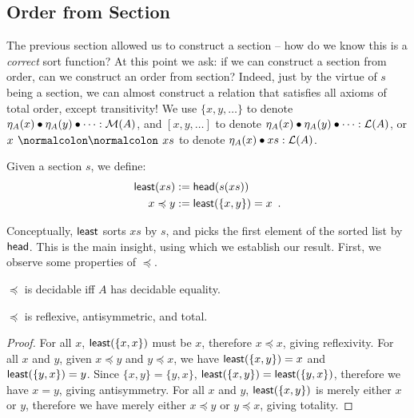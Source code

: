 \subsection{Order from Section}

The previous section allowed us to construct a section -- how do we know this is a \emph{correct} sort function?
%
At this point we ask: if we can construct a section from order, can we construct an order from section?
%
Indeed, just by the virtue of $s$ being a section, we can almost construct a relation that satisfies
all axioms of total order, except transitivity!
We use $\{x,y,\dots\}$ to denote $\eta_A(x) \mathbin{\bullet} \eta_A(y) \mathbin{\bullet} \dots : \mathcal{M}(A)$,
and $[x, y, \dots]$ to denote $\eta_A(x) \mathbin{\bullet} \eta_A(y) \mathbin{\bullet} \dots : \mathcal{L}(A)$,
or $x \cons xs$ to denote $\eta_A(x) \mathbin{\bullet} xs : \mathcal{L}(A)$.

\begin{definition}
    \label{def:least}
    Given a section $s$, we define:
    \[
        \begin{aligned}
            \operatorname{\mathsf{least}}(xs) & := \operatorname{\mathsf{head}}(s(xs))                    \\
            x \preccurlyeq y & := \operatorname{\mathsf{least}}(\{x, y\}) = x \enspace .
        \end{aligned}
    \]
\end{definition}

Conceptually, $\operatorname{\mathsf{least}}$ sorts $xs$ by $s$, and picks the first element of the sorted list by~$\operatorname{\mathsf{head}}$.
This is the main insight, using which we establish our result.
First, we observe some properties of $\preccurlyeq$.

\begin{proposition}
    $\preccurlyeq$ is decidable iff $A$ has decidable equality.
\end{proposition}

\begin{proposition}\label{sort:almost-total}
    $\preccurlyeq$ is reflexive, antisymmetric, and total.
\end{proposition}
\begin{proof}
    For all $x$, $\operatorname{\mathsf{least}}(\{x, x\})$ must be $x$, therefore $x \preccurlyeq x$, giving reflexivity.
    For all $x$ and $y$, given $x \preccurlyeq y$ and $y \preccurlyeq x$,
    we have $\operatorname{\mathsf{least}}(\{x, y\}) = x$ and $\operatorname{\mathsf{least}}(\{y, x\}) = y$.
    Since $\{x, y\} = \{y, x\}$, $\operatorname{\mathsf{least}}(\{x, y\}) = \operatorname{\mathsf{least}}(\{y, x\})$,
    therefore we have $x = y$, giving antisymmetry.
    For all $x$ and $y$, $\operatorname{\mathsf{least}}(\{x, y\})$ is merely either $x$ or $y$,
    therefore we have merely either $x \preccurlyeq y$ or $y \preccurlyeq x$, giving totality.
\end{proof}

